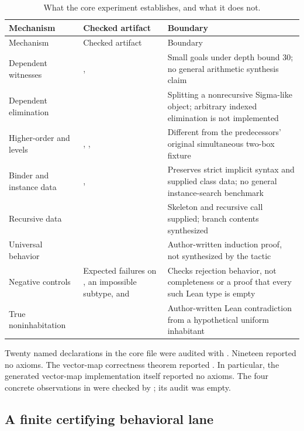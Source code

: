 \begin{longtable}{@{}L{0.28\textwidth}L{0.31\textwidth}L{0.34\textwidth}@{}}
\caption{What the core experiment establishes, and what it does not.}\label{tab:core-tests}\\
\toprule
Mechanism & Checked artifact & Boundary \\
\midrule
\endfirsthead
\toprule Mechanism & Checked artifact & Boundary \\
\midrule
\endhead
\bottomrule
\endfoot
Dependent witnesses & ,  & Small goals under depth bound 30; no general arithmetic synthesis claim \\
Dependent elimination &  & Splitting a nonrecursive Sigma-like object; arbitrary indexed elimination is not implemented \\
Higher-order and levels & , ,  & Different from the predecessors' original simultaneous two-box fixture \\
Binder and instance data & ,  & Preserves strict implicit syntax and supplied class data; no general instance-search benchmark \\
Recursive data &  & Skeleton and recursive call supplied; branch contents synthesized \\
Universal behavior &  & Author-written induction proof, not synthesized by the tactic \\
Negative controls & Expected failures on , an impossible subtype, and  & Checks rejection behavior, not completeness or a proof that every such Lean type is empty \\
True noninhabitation &  & Author-written Lean contradiction from a hypothetical uniform inhabitant \\
\end{longtable}

Twenty named declarations in the core file were audited with . Nineteen reported no axioms. The vector-map correctness theorem reported . In particular, the generated vector-map implementation itself reported no axioms. The four concrete observations in  were checked by ; its audit was empty.

\subsection{A finite certifying behavioral lane}


